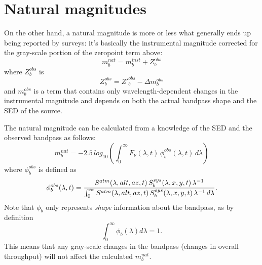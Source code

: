 \documentclass[12pt,preprint]{aastex}
\begin{document}
\section{Natural magnitudes}

On the other hand, a natural magnitude is more or less what generally ends up being reported by surveys: it's basically the instrumental magnitude corrected for the gray-scale portion of the zeropoint term above: 
\begin{equation}
m_b^{nat} = m_b^{inst} + Z_b^{obs}
\end{equation}
where $Z_b^{obs}$ is 
\begin{equation}
Z_b^{obs} =  {Z'}_b^{obs} -  \Delta m_b^{obs}
\end{equation}
and $m_b^{obs}$ is a term that contains only wavelength-dependent changes in the instrumental magnitude and depends on both the actual bandpass shape and the SED of the source. 

The natural magnitude can be calculated from a knowledge of the SED and the observed bandpass as follows: 
\begin{equation}
m_b^{nat}  = -2.5\,log_{10} \left( { \int_0^\infty {F_\nu(\lambda,t) \,\phi_b^{obs}(\lambda,t) \, d\lambda} } \right)
\end{equation}
where $\phi_b^{obs}$ is defined as
\begin{equation}
\label{eqn:PhiDef}
   \phi_b^{obs}(\lambda,t) =  {
     {S^{atm}(\lambda,alt,az,t)\, S_b^{sys}(\lambda,x,y,t) \,
       \lambda^{-1}} \over
     \int_0^\infty { {S^{atm}(\lambda,alt,az,t) \,
         S_b^{sys}(\lambda,x,y,t) \, \lambda^{-1}} \,d\lambda}}.
\end{equation}
Note that $\phi_b$ only represents {\it shape} information about the
bandpass, as by definition
\begin{equation}
\int_0^\infty {\phi_b(\lambda)  d\lambda}=1. 
\end{equation}
This means that any gray-scale changes in the bandpass (changes in overall throughput) will not affect the calculated $m_b^{nat}$. 
\end{document}

